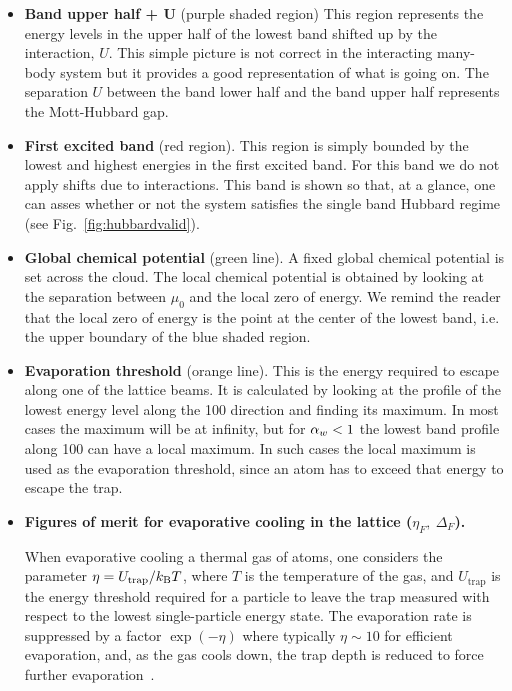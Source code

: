 \begin{itemize}
\item \textbf{Band upper half + $\mathbf{U}$ } (purple shaded region)  This
region represents the energy levels in the upper half of the lowest band
shifted up by the interaction, $U$.  This simple picture is not correct in the
interacting many-body system but it provides a good representation of what is
going on.  The separation $U$ between the band lower half and the band upper
half represents the Mott-Hubbard gap. 


\item \textbf{First excited band} (red region).   This region is simply bounded
by the lowest and highest energies in the first excited band.  For this band we
do not apply shifts due to interactions.   This band is shown so that, at a
glance, one can asses whether or not the system satisfies the single band
Hubbard regime (see Fig.~\ref{fig:hubbardvalid}).  

\item \textbf{Global chemical potential} (green line).  A fixed global
chemical potential is set across the cloud.  The local chemical potential is
obtained by looking at the separation between $\mu_{0}$ and the local zero of
energy.   We remind the reader that the local zero of energy is the point at
the center of the lowest band, i.e. the upper boundary of the blue shaded
region.

\item \textbf{Evaporation threshold} (orange line).   This is the energy
required to escape along one of the lattice beams.  It is calculated by looking
at the profile of the lowest energy level along the 100 direction and finding
its maximum.    In most cases the maximum will be at infinity, but for $ \alpha_{w} 
< 1 $ the lowest band profile along 100 can have a local maximum.   In such
cases the local maximum is used as the evaporation threshold, since an atom has
to exceed that energy to escape the trap.  


\item \textbf{Figures of merit for evaporative cooling in the lattice
($\eta_{F},\ \Delta_{F}$).} 

When evaporative cooling a thermal gas of atoms, one considers the parameter
$\eta=U_{\text{trap}}/k_{\mathrm{B}} T$, where $T$ is the temperature of the gas, and
$U_{\text{trap}}$ is the energy threshold required for a particle to leave the
trap  measured with respect to the lowest single-particle
energy state.  The evaporation rate is suppressed by a factor $\exp(-\eta)$
where typically $\eta\sim10$ for efficient evaporation,  and, as the gas cools
down, the trap depth is reduced to force further evaporation~\cite{OHara2001PRAb}.  


\end{itemize}
